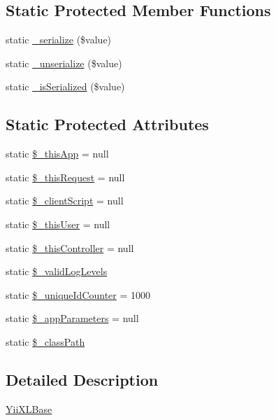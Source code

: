 \subsection*{Static Protected Member Functions}
\begin{DoxyCompactItemize}
\item 
static \hyperlink{classYiiXLBase_af7a9c5672451dd6c272f29549ca73031}{\_\-serialize} (\$value)
\item 
static \hyperlink{classYiiXLBase_ad0529f408772d761908d3a4aaa7a895a}{\_\-unserialize} (\$value)
\item 
static \hyperlink{classYiiXLBase_a9d036f61793a71d5c351031d2ecc0e53}{\_\-isSerialized} (\$value)
\end{DoxyCompactItemize}
\subsection*{Static Protected Attributes}
\begin{DoxyCompactItemize}
\item 
static \hyperlink{classYiiXLBase_af6f88e94a08d7714446e9d14aec8eccd}{\$\_\-thisApp} = null
\item 
static \hyperlink{classYiiXLBase_ab300f41b1bfad0b7fbf250eb7fb46eea}{\$\_\-thisRequest} = null
\item 
static \hyperlink{classYiiXLBase_a7e5fa1f4672a5a8a8ddb2d96bea86daa}{\$\_\-clientScript} = null
\item 
static \hyperlink{classYiiXLBase_a942de4b5bc91566b1ca1452da4166059}{\$\_\-thisUser} = null
\item 
static \hyperlink{classYiiXLBase_a32cb14890abc35b436e106a457c6ca97}{\$\_\-thisController} = null
\item 
static \hyperlink{classYiiXLBase_a939fa17840a3090aae1372c6c1cdb756}{\$\_\-validLogLevels}
\item 
static \hyperlink{classYiiXLBase_ae29325c48ae2985f2733685efb776ce9}{\$\_\-uniqueIdCounter} = 1000
\item 
static \hyperlink{classYiiXLBase_ace966ab0b5f00686b49f86b4d4a664a2}{\$\_\-appParameters} = null
\item 
static \hyperlink{classYiiXLBase_a3f47ff234cfea41e28e030bbf75c56eb}{\$\_\-classPath}
\end{DoxyCompactItemize}


\subsection{Detailed Description}
\hyperlink{classYiiXLBase}{YiiXLBase}

